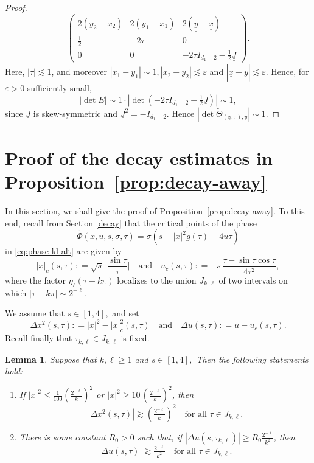 \documentclass[leqno]{amsart}
\newtheorem{lemma}[theorem]{Lemma}
\theoremstyle{definition}
\theoremstyle{remark}
\numberwithin{equation}{section}
\newcommand\ve{{\varepsilon}}
\begin{document}
\begin{proof}
\[\begin{pmatrix}
2(y_2-x_2) & 2(y_1-x_1)& 2(\underline{\underline y}-\underline{\underline x})\\ 
 \frac{1}{2} & -2\tau &0\\
0  & 0&  -2\tau I_{d_1-2}  - \tfrac 12\underline{\underline J} 
\end{pmatrix}.
\]
Here, $|\tau|\lesssim 1$, and moreover $|x_1-y_1|\sim 1, |x_2-y_2|\lesssim \ve $ and $|\underline{\underline x}- \underline {\underline y}|\lesssim \ve$. Hence, for $\ve>0$ sufficiently small,
\[
|{\det E}|\sim 1\cdot  |\det (-2\tau I_{d_1-2}  - \tfrac 12\underline{\underline J})|\sim 1,
\]
since $\underline{\underline J}$ is skew-symmetric and  $\underline{\underline J}^2=-I_{d_1-2}.$ Hence $|\det \tilde\Theta_{(\underline x,\tau),y} |\sim 1.$
\end{proof}


\appendix

\section{Proof of the decay estimates in Proposition~\ref{prop:decay-away}}\label{decayproof}

In this section, we shall give the proof of Proposition~\ref{prop:decay-away}. To this end, recall from Section \ref{decay} that the critical points of the phase
\[
\tilde \Phi(x,u,s,\sigma,\tau) = \sigma(s-|x|^2 g(\tau) + 4u\tau)
\]
in \eqref{eq:phase-kl-alt} are given by 
\[
|x|_c(s,\tau): = \sqrt{s} \, \Big|\frac{\sin\tau}{\tau}\Big| \quad\text{and}\quad 
u_c(s,\tau): = - s \, \frac{\tau-\sin\tau\cos\tau}{ 4 \tau^2},
\]
where the factor $\eta_\ell(\tau-k \pi)$ localizes to the union  $J_{k,\ell}$ of two intervals on which $|\tau-k \pi| \sim 2^{-\ell}.$

We assume that $s \in[1,4],$ and set
\[
\Delta x^2 (s,\tau): = |x|^2-|x|_{c}^2 (s,\tau) \quad\text{and}\quad \Delta u(s,\tau): = u-u_c(s,\tau).
\]
Recall finally that $\tau_{k,\ell} \in J_{k,\ell}$ is fixed. 

\begin{lemma}\label{lem:decay-away-1}
Suppose that $k,\ell\ge 1$ and $s \in[1,4],$ Then the following statements hold: 
\begin{enumerate}
 \item If $|x|^2 \leq \frac{1}{100}(\tfrac{2^{-\ell}}{k})^2$ or $|x|^2 \ge 10 \, (\tfrac{2^{-\ell}}{k})^2 $, then
 \[
 |\Delta x^2 (s,\tau)| \gtrsim(\tfrac{2^{-\ell}}{k})^2 \quad\text{for all } \tau \in J_{k,\ell}.
 \]
\item There is some constant $R_0 > 0$ such that, if $\left|\Delta u(s,\tau_{k,\ell})\right| \ge R_0  \tfrac{2^{-\ell}}{k^2}$, then
\[
\left|\Delta u(s,\tau)\right| \gtrsim \tfrac{2^{-\ell}}{k^2} \quad \text{for all } \tau \in J_{k,\ell}.
\]
\end{enumerate}
\end{lemma}
\end{document}
